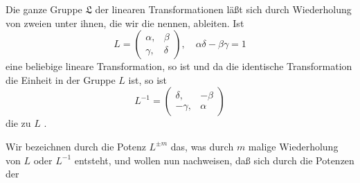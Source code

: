 Die ganze Gruppe $\mathfrak{L}$ der linearen Transformationen läßt sich
durch Wiederholung von zweien unter ihnen, die wir die  nennen, ableiten.
Ist
\[
L = \begin{pmatrix}\alpha, & \beta\\\gamma, & \delta\end{pmatrix}, \quad \alpha\delta - \beta\gamma = 1
\]
eine beliebige lineare Transformation, so ist
und da die identische Transformation die Einheit in der Gruppe $L$
ist, %
so ist
\[
L^{-1} = \begin{pmatrix}\delta, & -\beta\\-\gamma, & \alpha\end{pmatrix}
\]
die zu $L$ .

Wir bezeichnen durch die Potenz $L^{\pm m}$ das, was durch $m$ malige
Wiederholung von $L$ oder $L^{-1}$ entsteht, und wollen nun nachweisen,
daß sich durch die Potenzen der 

